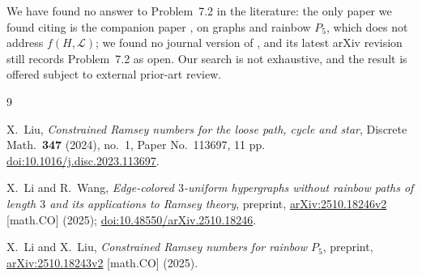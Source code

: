 \documentclass[11pt]{amsart}
\newcommand{\Lpath}{\mathcal L}
\begin{document}
We have found no answer to Problem~7.2 in
the literature: the only paper we found citing \cite{LiWang} is the
companion paper \cite{LiLiu}, on graphs and rainbow $P_5$, which does not
address $f(H,\Lpath)$; we found no journal version of \cite{LiWang}, and
its latest arXiv revision still records Problem~7.2 as open. Our search
is not exhaustive, and the result is offered subject to external
prior-art review.

\begin{thebibliography}{9}

X.~Liu,
\emph{Constrained Ramsey numbers for the loose path, cycle and star},
Discrete Math.\ \textbf{347} (2024), no.~1, Paper No.~113697, 11 pp.
\href{https://doi.org/10.1016/j.disc.2023.113697}
{doi:10.1016/j.disc.2023.113697}.

X.~Li and R.~Wang,
\emph{Edge-colored $3$-uniform hypergraphs without rainbow paths of
length $3$ and its applications to Ramsey theory},
preprint, \href{https://arxiv.org/abs/2510.18246}{arXiv:2510.18246v2}
[math.CO] (2025);
\href{https://doi.org/10.48550/arXiv.2510.18246}
{doi:10.48550/arXiv.2510.18246}.

X.~Li and X.~Liu,
\emph{Constrained Ramsey numbers for rainbow $P_5$},
preprint, \href{https://arxiv.org/abs/2510.18243}{arXiv:2510.18243v2}
[math.CO] (2025).

\end{thebibliography}
\end{document}
